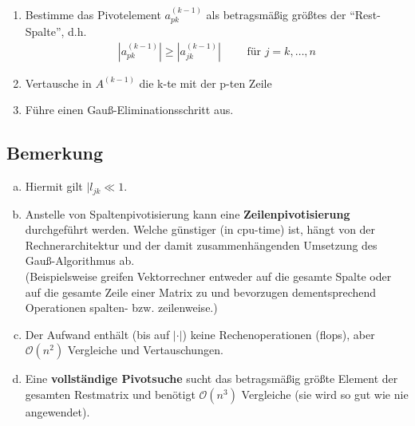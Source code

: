 \documentclass[ngerman,fontsize=11pt, paper=a4, parskip=half, titlepage=true, toc=bib]{scrbook}
\begin{document}
\begin{enumerate}[1.]
	\item Bestimme das Pivotelement $a_{pk}^{(k-1)}$ 
		als betragsmäßig größtes der \enquote{Rest-Spalte}, d.h.
		\begin{gather*}
			|a_{pk}^{(k-1)}|\geq |a_{jk}^{(k-1)}| \qquad  \text{ für } j=k,\dots , n
		\end{gather*}
	\item Vertausche in $A^{(k-1)}$ die k-te mit der p-ten Zeile
	\item Führe einen Gauß-Eliminationsschritt aus.
\end{enumerate}

\subsection{Bemerkung}
\begin{enumerate}[a)]
	\item Hiermit gilt $|l_{jk} \ll 1$.
	\item Anstelle von Spaltenpivotisierung kann eine \textbf{Zeilenpivotisierung}
	durchgeführt werden.
	Welche günstiger (in cpu-time) ist, hängt von der Rechnerarchitektur und
	der damit zusammenhängenden Umsetzung des Gauß-Algorithmus ab.\\
	(Beispielsweise greifen Vektorrechner entweder auf die gesamte Spalte
	oder auf die gesamte Zeile einer Matrix zu und bevorzugen dementsprechend
	Operationen spalten- bzw. zeilenweise.)
	\item Der Aufwand enthält (bis auf $|\cdot |$) keine Rechenoperationen (flops),
	aber $\mathcal{O}(n^2)$ Vergleiche und Vertauschungen.
	\item Eine \textbf{vollständige Pivotsuche} sucht das betragsmäßig größte Element der gesamten Restmatrix und benötigt $\mathcal{O}(n^3) $ Vergleiche
	(sie wird so gut wie nie angewendet).
\end{enumerate}
\end{document}
